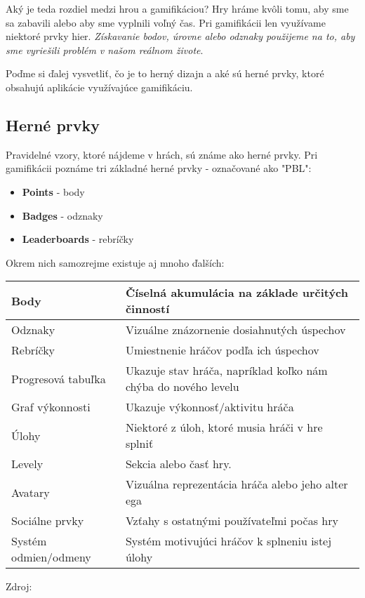 \documentclass{article}
\begin{document}
Aký je teda rozdiel medzi hrou a gamifikáciou? Hry hráme kvôli tomu, aby sme sa zabavili alebo aby sme vyplnili voľný čas. Pri gamifikácii len využívame niektoré prvky hier. \emph{Získavanie bodov, úrovne alebo odznaky použijeme na to, aby sme vyriešili problém v našom reálnom živote}\cite{blog}. 

Poďme si ďalej vysvetliť, čo je to herný dizajn a aké sú herné prvky, ktoré obsahujú aplikácie využívajúce gamifikáciu.

\subsection{Herné prvky} \label{prvky}

Pravidelné vzory, ktoré nájdeme v hrách, sú známe ako herné prvky. Pri gamifikácii poznáme tri základné herné prvky - označované ako "PBL":

\begin{itemize}
\item \textbf{Points} - body
\item \textbf{Badges} - odznaky
\item \textbf{Leaderboards} - rebríčky
\end{itemize}

Okrem nich samozrejme existuje aj mnoho ďalších:

\begin{center}
\begin{tabular}{ | m{4cm} | m{10cm}| } 

\hline
Body & Číselná akumulácia na základe určitých činností \\ 
\hline
Odznaky & Vizuálne znázornenie dosiahnutých úspechov \\ 
\hline
Rebríčky & Umiestnenie hráčov podľa ich úspechov \\ 
\hline
Progresová tabuľka & Ukazuje stav hráča, napríklad koľko nám chýba do nového levelu \\ 
\hline
Graf výkonnosti & Ukazuje výkonnosť/aktivitu hráča \\ 
\hline
Úlohy & Niektoré z úloh, ktoré musia hráči v hre splniť \\ 
\hline
Levely & Sekcia alebo časť hry. \\ 
\hline
Avatary & Vizuálna reprezentácia hráča alebo jeho alter ega \\ 
\hline
Sociálne prvky & Vzťahy s ostatnými používateľmi počas hry \\ 
\hline
Systém odmien/odmeny & Systém motivujúci hráčov k splneniu istej úlohy \\ 
\hline
\end{tabular}
Zdroj:  \cite{hlavnyclanok} 
\label{tabulka}
\end{center}
\end{document}

